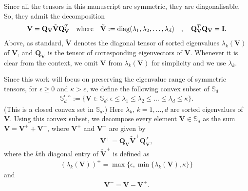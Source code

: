 \documentclass[final,12pt]{amsart}
\theoremstyle{plain}
\theoremstyle{definition}
\newcommand\bV{\mathbf{V}}
\begin{document}
Since all the tensors in this manuscript are symmetric, they are diagonalisable. So, they admit the
decomposition
\begin{equation}
	\mathbf{V}=\mathbf{Q}_{\bV}\tilde{\mathbf{V}}\mathbf{Q}^{T}_{\bV}\quad\textrm{where}\quad
	\tilde{\mathbf{V}}:={\rm diag}(\lambda_{1}, \lambda_{2},\ldots,\lambda_{d})\quad,\quad   \mathbf{Q}_{\bV}^{T}\mathbf{Q}_{\bV}=\mathbf{I}.
\end{equation}
Above, as standard, $\tilde{\mathbf{V}}$ denotes the diagonal tensor of sorted eigenvalues $\lambda_{k}(\mathbf{V})$ of $\mathbf{V}$, and $\mathbf{Q}_{\bV}$ is the tensor of corresponding eigenvectors of $\mathbf{V}$.
Whenever it is clear from the context, we omit $\mathbf{V}$
from $\lambda_{k}(\mathbf{V})$ for simplicity and we use $\lambda_{k}$.

Since this work will focus on preserving the eigenvalue range of symmetric tensors, for $\epsilon\ge 0$ 
 and  $\kappa> \epsilon$, we  define the following convex subset of $\mathbb{S}_d$ 
\begin{align}
	\mathbb{S}_{d}^{\epsilon,\kappa}:=\{\mathbf{V}\in \mathbb{S}_d :\epsilon	\leq \lambda_{1}^{}\leq \lambda_{2}^{}\leq\ldots\leq \lambda_{d}^{}\leq \kappa \}.\label{eq161}
\end{align} 
(This is a closed convex set in $\mathbb{S}_d$.)
Here  $\lambda_{k}^{}$, $k=1,\ldots,d$ are sorted eigenvalues of $\mathbf{V}$. 
Using this convex subset, we decompose 
every element $ \mathbf{V}\in \mathbb{S}_d$  as the sum
$\mathbf{V}=\mathbf{V}^{+}+\mathbf{V}^{-}$, where $\mathbf{V}^{+}$ and $\mathbf{V}^{-}$ are given by
\begin{align}
	\mathbf{V}^{+}= \mathbf{Q}_{\bV}\tilde{\mathbf{V}}^{+}\mathbf{Q}^{T}_{\bV},\label{Vplus}
\end{align}
where the $k$th diagonal entry of $\tilde{\mathbf{V}}^{+}$ is defined as 
\begin{align}
(\lambda_{k}(\mathbf{V}))^{+}=\max\Big\{\epsilon,\min\{\lambda_{k}(\mathbf{V}),\kappa\}\Big\} \label{lamoperator}
\end{align}
 and 
\begin{align}
	\mathbf{V}^{-}=\mathbf{V}-\mathbf{V}^{+}. \label{Vminus}
\end{align}
\end{document}
